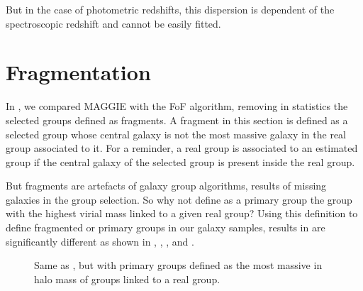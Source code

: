 But in the case of photometric redshifts, this dispersion is dependent of the
spectroscopic redshift and cannot be easily fitted.

\section{Fragmentation}
\label{sec:fragmentation}

In , we compared MAGGIE with the FoF
algorithm, removing in statistics the selected groups defined as fragments. A
fragment in this section is defined as a selected group whose central
galaxy is not the most massive galaxy in the real group associated to it. For a
reminder, a real group is associated to an estimated group if the central
galaxy of the selected group is present inside the real group.

But fragments are artefacts of galaxy group algorithms, results of missing
galaxies in the group selection. So why not define as a primary group the group
with the highest virial mass linked to a given real group? Using this
definition to define fragmented or primary groups in our galaxy samples,
results in  are significantly
different as shown in ,
, ,
 and .
%
\begin{figure}[t]
    \centering
    \begin{minipage}{0.49\linewidth}
    \end{minipage}
    \begin{minipage}{0.49\linewidth}
    \end{minipage}
    \caption{Same as , but with primary groups defined
    as the most massive in halo mass of groups linked to a real
group.\label{fig:comp_rel_fbm}}
\end{figure}

